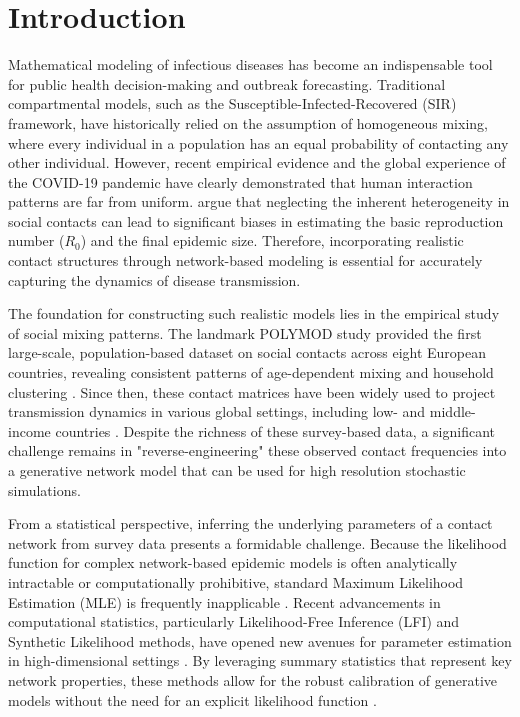 \section{Introduction}

Mathematical modeling of infectious diseases has become an indispensable tool for public health decision-making and outbreak forecasting.
Traditional compartmental models, such as the Susceptible-Infected-Recovered (SIR) framework, have historically relied on the assumption of homogeneous mixing, where every individual in a population has an equal probability of contacting any other individual.
However, recent empirical evidence and the global experience of the COVID-19 pandemic have clearly demonstrated that human interaction patterns are far from uniform.
\textcite{britton2025improving} argue that neglecting the inherent heterogeneity in social contacts can lead to significant biases in estimating the basic reproduction number ($R_0$) and the final epidemic size.
Therefore, incorporating realistic contact structures through network-based modeling is essential for accurately capturing the dynamics of disease transmission.

The foundation for constructing such realistic models lies in the empirical study of social mixing patterns.
The landmark POLYMOD study provided the first large-scale, population-based dataset on social contacts across eight European countries, revealing consistent patterns of age-dependent mixing and household clustering \parencite{mossong2008social}.
Since then, these contact matrices have been widely used to project transmission dynamics in various global settings, including low- and middle-income countries \parencite{prem2017projecting}.
Despite the richness of these survey-based data, a significant challenge remains in "reverse-engineering" these observed contact frequencies into a generative network model that can be used for high resolution stochastic simulations.

From a statistical perspective, inferring the underlying parameters of a contact network from survey data presents a formidable challenge.
Because the likelihood function for complex network-based epidemic models is often analytically intractable or computationally prohibitive, standard Maximum Likelihood Estimation (MLE) is frequently inapplicable \parencite{mckinley2009inference}.
Recent advancements in computational statistics, particularly Likelihood-Free Inference (LFI) and Synthetic Likelihood methods, have opened new avenues for parameter estimation in high-dimensional settings \parencite{ong2018likelihoodfree}.
By leveraging summary statistics that represent key network properties, these methods allow for the robust calibration of generative models without the need for an explicit likelihood function \parencite{picchini2023sequentially}.

